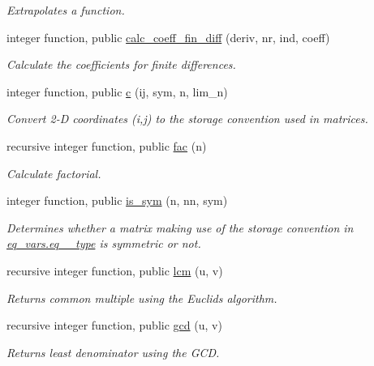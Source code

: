 \begin{DoxyCompactItemize}
\begin{DoxyCompactList}\small\item\em Extrapolates a function. \end{DoxyCompactList}\item 
integer function, public \hyperlink{namespacenum__utilities_a4dffe3beba7165dd17cff19a99a9e2ac}{calc\+\_\+coeff\+\_\+fin\+\_\+diff} (deriv, nr, ind, coeff)
\begin{DoxyCompactList}\small\item\em Calculate the coefficients for finite differences. \end{DoxyCompactList}\item 
integer function, public \hyperlink{namespacenum__utilities_a5ee3fbd1fe67d0deefc7194631389f2a}{c} (ij, sym, n, lim\+\_\+n)
\begin{DoxyCompactList}\small\item\em Convert 2-\/D coordinates (i,j) to the storage convention used in matrices. \end{DoxyCompactList}\item 
recursive integer function, public \hyperlink{namespacenum__utilities_a43ab60f9e202b55221373286a5bbb954}{fac} (n)
\begin{DoxyCompactList}\small\item\em Calculate factorial. \end{DoxyCompactList}\item 
integer function, public \hyperlink{namespacenum__utilities_a4e6994b5c92b3d16c8538b54db0beadd}{is\+\_\+sym} (n, nn, sym)
\begin{DoxyCompactList}\small\item\em Determines whether a matrix making use of the storage convention in \hyperlink{structeq__vars_1_1eq__2__type}{eq\+\_\+vars.\+eq\+\_\+\_\+type} is symmetric or not. \end{DoxyCompactList}\item 
recursive integer function, public \hyperlink{namespacenum__utilities_a33fc1483c840d5d3f9b12acfce21cad1}{lcm} (u, v)
\begin{DoxyCompactList}\small\item\em Returns common multiple using the Euclid\textquotesingle{}s algorithm. \end{DoxyCompactList}\item 
recursive integer function, public \hyperlink{namespacenum__utilities_a3d0d04a582b3a528fc7f9975d5d2a807}{gcd} (u, v)
\begin{DoxyCompactList}\small\item\em Returns least denominator using the G\+CD. \end{DoxyCompactList}\item 

\end{DoxyCompactItemize}
